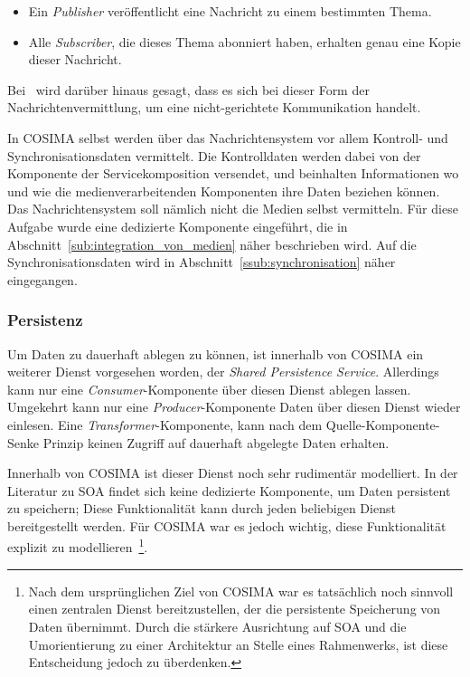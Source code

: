   \begin{itemize}
    \item Ein \emph{Publisher} veröffentlicht eine Nachricht zu einem bestimmten Thema.
    \item Alle \emph{Subscriber}, die dieses Thema abonniert haben, erhalten genau eine Kopie dieser Nachricht.
  \end{itemize}
  
  Bei~\citep[S. 127]{soa_goes_real} wird darüber hinaus gesagt, dass es sich bei dieser Form der Nachrichtenvermittlung, um eine nicht-gerichtete Kommunikation handelt.
  
  In COSIMA selbst werden über das Nachrichtensystem vor allem Kontroll- und Synchronisationsdaten vermittelt. Die Kontrolldaten werden dabei von der Komponente der Servicekomposition versendet, und beinhalten Informationen wo und wie die medienverarbeitenden Komponenten ihre Daten beziehen können. Das Nachrichtensystem soll nämlich nicht die Medien selbst vermitteln. Für diese Aufgabe wurde eine dedizierte Komponente eingeführt, die in Abschnitt~\ref{sub:integration_von_medien} näher beschrieben wird. Auf die Synchronisationsdaten wird in Abschnitt~\ref{ssub:synchronisation} näher eingegangen.
  

\subsubsection{Persistenz} %
\label{ssub:persistenz}

  Um Daten zu dauerhaft ablegen zu können, ist innerhalb von COSIMA ein weiterer Dienst vorgesehen worden, der \emph{Shared Persistence Service}. Allerdings kann nur eine \emph{Consumer}-Komponente über diesen Dienst ablegen lassen. Umgekehrt kann nur eine \emph{Producer}-Komponente Daten über diesen Dienst wieder einlesen. Eine \emph{Transformer}-Komponente, kann nach dem Quelle-Komponente-Senke Prinzip keinen Zugriff auf dauerhaft abgelegte Daten erhalten.
  
  Innerhalb von COSIMA ist dieser Dienst noch sehr rudimentär modelliert. In der Literatur zu SOA findet sich keine dedizierte Komponente, um Daten persistent zu speichern; Diese Funktionalität kann durch jeden beliebigen Dienst bereitgestellt werden. Für COSIMA war es jedoch wichtig, diese Funktionalität explizit zu modellieren~\citep{bericht}\footnote{Nach dem  ursprünglichen Ziel von COSIMA war es tatsächlich noch sinnvoll einen zentralen Dienst bereitzustellen, der die persistente Speicherung von Daten übernimmt. Durch die stärkere Ausrichtung auf SOA und die Umorientierung zu einer Architektur an Stelle eines Rahmenwerks, ist diese Entscheidung jedoch zu überdenken.}.
  
